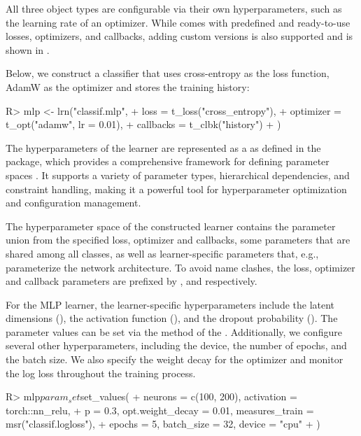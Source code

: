\documentclass[article]{jss}
\theoremstyle{definition}
\begin{document}
All three object types are configurable via their own hyperparameters, such as the learning rate of an optimizer.
While  comes with predefined and ready-to-use losses, optimizers, and callbacks, adding custom versions is also supported and is shown in .

Below, we construct a  classifier that uses cross-entropy as the loss function, AdamW as the optimizer \citep{ref-loshchilov2017decoupled} and stores the training history:

\begin{CodeInput}
R> mlp <- lrn("classif.mlp",
+   loss = t_loss("cross_entropy"),
+   optimizer = t_opt("adamw", lr = 0.01),
+   callbacks = t_clbk("history")
+  )
\end{CodeInput}

The hyperparameters of the learner are represented as a  as defined in the  package, which provides a comprehensive framework for defining parameter spaces \citep{ref-paradox2024}.
It supports a variety of parameter types, hierarchical dependencies, and constraint handling, making it a powerful tool for hyperparameter optimization and configuration management.

The hyperparameter space of the constructed learner contains the parameter union from the specified loss, optimizer and callbacks, some parameters that are shared among all  classes, as well as learner-specific parameters that, e.g., parameterize the network architecture.
To avoid name clashes, the loss, optimizer and callback parameters are prefixed by ,   and  respectively.

For the MLP learner, the learner-specific hyperparameters include the latent dimensions (), the activation function (), and the dropout probability ().
The parameter values can be set via the  method of the .
Additionally, we configure several other hyperparameters, including the device, the number of epochs, and the batch size.
We also specify the weight decay for the optimizer and monitor the log loss throughout the training process.

\begin{CodeInput}
R> mlp$param_set$set_values(
+    neurons = c(100, 200), activation = torch::nn_relu,
+    p = 0.3, opt.weight_decay = 0.01, measures_train = msr("classif.logloss"),
+    epochs = 5, batch_size = 32, device = "cpu"
+  )
\end{CodeInput}
\end{document}
